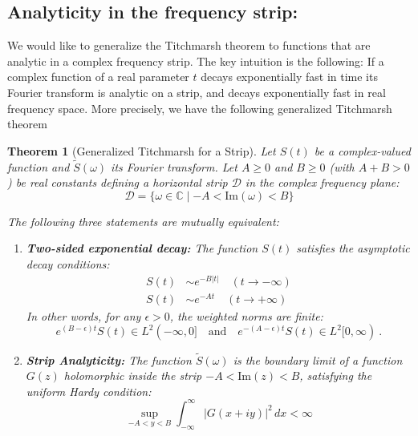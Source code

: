 \documentclass[a4paper,11pt]{article}
\newtheorem{theorem}{Theorem}
\theoremstyle{definition}
\begin{document}
\subsection{Analyticity in the frequency strip:}

We would like to generalize the Titchmarsh theorem to functions that are analytic in a complex frequency strip. The key intuition is the following: If a complex function of a real parameter $t$ decays exponentially fast in time its Fourier transform is analytic on a strip, and decays exponentially fast in real frequency space. More precisely, we have the following generalized Titchmarsh theorem


\begin{theorem}[Generalized Titchmarsh for a Strip]\label{titchmarshStrip}
Let $S(t)$ be a complex-valued function and $\tilde{S}(\omega)$ its Fourier transform. Let $A \ge 0$ and $B \ge 0$ (with $A+B > 0$) be real constants defining a horizontal strip $\mathcal{D}$ in the complex frequency plane:
\begin{equation}
    \mathcal{D} = \{ \omega \in \mathbb{C} \mid -A < \text{Im}(\omega) < B \}
\end{equation}

The following three statements are mutually equivalent:

\begin{enumerate}
    \item \textbf{Two-sided exponential decay:}
    The function $S(t)$ satisfies the asymptotic decay conditions:
    \begin{align}
        S(t) &\sim e^{-B|t|} \quad (t \to -\infty) \\
        S(t) &\sim e^{-At} \quad (t \to +\infty)
    \end{align}
    In other words, for any $\epsilon > 0$, the weighted norms are finite:
    \begin{equation}
        e^{(B-\epsilon)t} S(t) \in L^2(-\infty, 0] \quad \text{and} \quad e^{-(A-\epsilon)t} S(t) \in L^2[0, \infty)\ .
    \end{equation}

    \item \textbf{Strip Analyticity:}
    The function $\tilde{S}(\omega)$ is the boundary limit of a function $G(z)$ holomorphic inside the strip $-A < \text{Im}(z) < B$, satisfying the uniform Hardy condition:
    \begin{equation}
        \sup_{-A < y < B} \int_{-\infty}^{\infty} |G(x + iy)|^2 \, dx < \infty
    \end{equation}


\end{enumerate}
\end{theorem}
\end{document}
